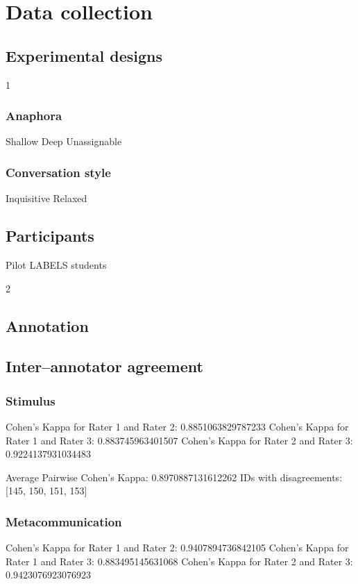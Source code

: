 
\section{Data collection}

\subsection{Experimental designs}

1
\subsubsection{Anaphora}
Shallow
Deep
Unassignable
\subsubsection{Conversation style}
Inquisitive
Relaxed

\subsection{Participants}
Pilot
LABELS students

2
\subsection{Annotation}

\subsection{Inter--annotator agreement}

\subsubsection{Stimulus}
        Cohen's Kappa for Rater 1 and Rater 2: 0.8851063829787233
        Cohen's Kappa for Rater 1 and Rater 3: 0.883745963401507
        Cohen's Kappa for Rater 2 and Rater 3: 0.9224137931034483

        Average Pairwise Cohen's Kappa: 0.8970887131612262
        IDs with disagreements:
        [145, 150, 151, 153]

\subsubsection{Metacommunication}
        Cohen's Kappa for Rater 1 and Rater 2: 0.9407894736842105
        Cohen's Kappa for Rater 1 and Rater 3: 0.883495145631068
        Cohen's Kappa for Rater 2 and Rater 3: 0.9423076923076923

